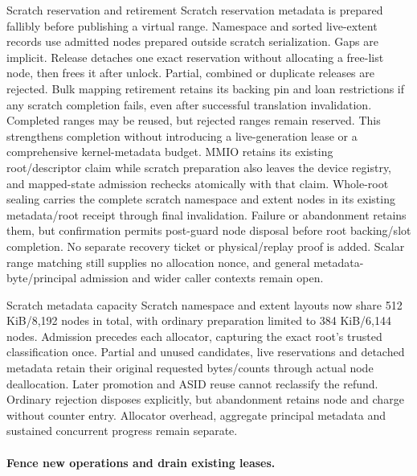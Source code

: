 \begin{implementationdetail}{Scratch reservation and retirement}
Scratch reservation metadata is prepared fallibly before publishing a virtual
range. Namespace and sorted live-extent records use admitted nodes prepared
outside scratch serialization. Gaps are implicit. Release detaches one exact
reservation without allocating a free-list node, then frees it after unlock.
Partial, combined or duplicate releases are rejected. Bulk mapping retirement
retains its backing pin and loan restrictions if any scratch completion fails,
even after successful translation invalidation. Completed ranges may be reused, but
rejected ranges remain reserved. This strengthens completion without introducing
a live-generation lease or a comprehensive kernel-metadata budget.
MMIO retains its existing root/descriptor claim while scratch preparation also
leaves the device registry, and mapped-state admission rechecks atomically with that
claim. Whole-root sealing carries the complete scratch namespace and extent nodes
in its existing metadata/root receipt through final invalidation. Failure or
abandonment retains them, but confirmation permits post-guard node disposal before
root backing/slot completion. No separate recovery ticket or physical/replay proof
is added. Scalar range matching still supplies no allocation nonce, and general
metadata-byte/principal admission and wider caller contexts remain open.
\end{implementationdetail}

\begin{implementationdetail}{Scratch metadata capacity}
Scratch namespace and extent layouts now share 512 KiB/8,192 nodes in total,
with ordinary preparation limited to 384 KiB/6,144 nodes. Admission precedes each
allocator, capturing the exact root's trusted classification once. Partial and
unused candidates, live reservations and detached metadata retain their original
requested bytes/counts through actual node deallocation. Later promotion and
ASID reuse cannot reclassify the refund. Ordinary rejection disposes explicitly, but
abandonment retains node and charge without counter entry. Allocator overhead,
aggregate principal metadata and sustained concurrent progress remain separate.
\end{implementationdetail}

\paragraph*{Fence new operations and drain existing leases.}


